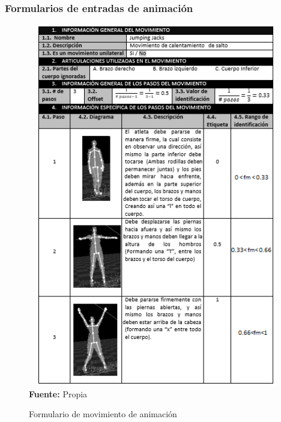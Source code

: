 \subsubsection{Formularios de entradas de animaci\'on}
\begin{figure}[H]
	\caption{Formulario de movimiento de animaci\'on}
	\label{fig:frmMovCheer}
	\centering	\includegraphics[width=445px,height=600px]{graphics/resultados/movimientoCheerleader.PNG} \\
	\textbf{Fuente:} Propia
\end{figure}
